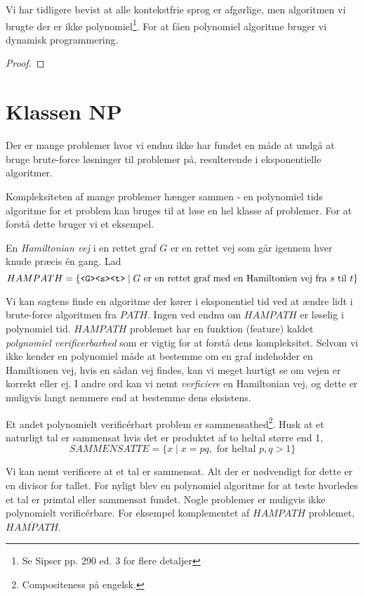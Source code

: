 Vi har tidligere bevist at alle kontekstfrie sprog er afgørlige, men algoritmen vi brugte der er ikke polynomiel\footnote{Se Sipser pp. 290 ed. 3 for flere detaljer}. For at fåen polynomiel algoritme bruger vi dynamisk programmering.
\begin{proof}

\end{proof}

\section{Klassen NP}%
\label{sec:np}

Der er mange problemer hvor vi endnu ikke har fundet en måde at undgå at bruge brute-force løsninger til problemer på, resulterende i eksponentielle algoritmer.

Kompleksiteten af mange problemer hænger sammen - en polynomiel tids algoritme for et problem kan bruges til at løse en hel klasse af problemer. For at forstå dette bruger vi et eksempel.

En \textit{Hamiltonian vej} i en rettet graf $G$ er en rettet vej som går igennem hver knude præcis én gang. Lad
\begin{equation*}
	HAMPATH = \{\text{\texttt{<G><s><t>}} \mid G \text{ er en rettet graf med en Hamiltonien vej fra } s \text{ til } t\}
\end{equation*}

Vi kan sagtens finde en algoritme der kører i eksponentiel tid ved at ændre lidt i brute-force algoritmen fra $PATH$. Ingen ved endnu om $HAMPATH$ er løselig i polynomiel tid. $HAMPATH$ problemet har en funktion (feature) kaldet \textit{polynomiel verificerbarhed} som er vigtig for at forstå dens kompleksitet. Selvom vi ikke kender en polynomiel måde at bestemme om en graf indeholder en Hamiltionen vej, hvis en sådan vej findes, kan vi meget hurtigt se om vejen er korrekt eller ej. I andre ord kan vi nemt \textit{verficiere} en Hamiltonian vej, og dette er muligvis langt nemmere end at bestemme dens eksistens.

Et andet polynomielt verificérbart problem er sammensathed\footnote{Compositeness på engelsk.}. Husk at et naturligt tal er sammensat hvis det er produktet af to heltal større end 1,
\begin{equation*}
	SAMMENSATTE = \{x \mid x = pq, \text{ for heltal } p, q > 1\}
\end{equation*}

Vi kan nemt verificere at et tal er sammensat. Alt der er nødvendigt for dette er en divisor for tallet. For nyligt blev en polynomiel algoritme for at teste hvorledes et tal er primtal eller sammensat fundet. Nogle problemer er muligvis ikke polynomielt verificérbare. For eksempel komplementet af $HAMPATH$ problemet, $\overline{HAMPATH}$.

